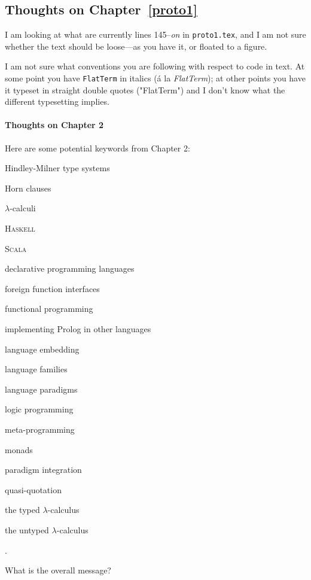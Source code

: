 \begin{scope}
\subsection{Thoughts on Chapter~\ref{proto1}}\label{subsec:thoughts-chapt-proto1}

I am looking at what are currently lines 145--\textit{on} in
\Verb!proto1.tex!, and I am not sure whether 
the text should be loose---as you have it, or floated to a figure.

I am not sure what conventions you are following with respect to code in
text.
At some point you have \Verb!FlatTerm! in italics (\'a la
\textit{FlatTerm}); at other points you have it typeset in straight
double quotes ("FlatTerm") and I don't know what the different
typesetting implies.


\paragraph{Thoughts on Chapter 2}

Here are some potential keywords from Chapter 2:
\begin{inparaitem}
\item Hindley-Milner type systems
\item Horn clauses
\item \(\lambda\)-calculi
\item \textsc{Haskell}
\item \textsc{Scala}
\item declarative programming languages
\item foreign function interfaces
\item functional programming
\item implementing Prolog in other languages
\item language embedding
\item language families
\item language paradigms
\item logic programming
\item meta-programming
\item monads
\item paradigm integration
\item quasi-quotation
\item the typed \(\lambda\)-calculus
\item the untyped \(\lambda\)-calculus
\end{inparaitem}.

What is the overall message?


\end{scope}
